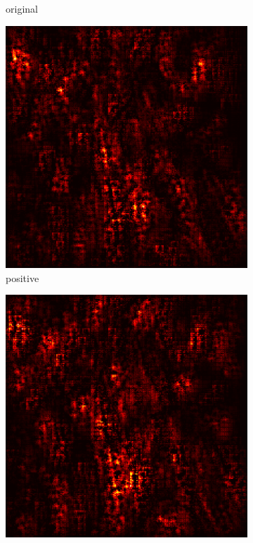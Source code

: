 \documentclass[preprint,12pt]{elsarticle}
\begin{document}
\begin{figure}
\begin{subfigure}{0.14\linewidth}
        \caption{original}
    \end{subfigure}
    \hfill
    \begin{subfigure}{0.14\textwidth}
        \centering
        \includegraphics[width=\linewidth]{../visualizations/examples/imagenette/cnn/positive_saliency_map/6.png}
        \caption{positive}
    \end{subfigure}
    \hfill
    \begin{subfigure}{0.14\textwidth}
        \centering
        \includegraphics[width=\linewidth]{../visualizations/examples/imagenette/cnn/negative_saliency_map/6.png}

\end{subfigure}
\end{figure}
\end{document}
